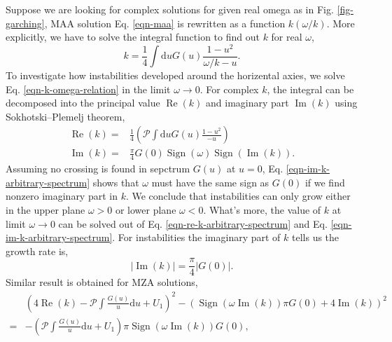 Suppose we are looking for complex solutions for given real omega as in Fig. \ref{fig-garching}, MAA solution Eq. \eqref{eqn-maa} is rewritten as a function $k(\omega/k)$. More explicitly, we have to solve the integral function to find out $k$ for real $\omega$,
\begin{equation}
   k = \frac{1}{4} \int \mathrm du G(u) \frac{ 1 - u^2 }{ \omega/k - u }.
   \label{eqn-k-omega-relation}
\end{equation}
To investigate how instabilities developed around the horizental axies, we solve Eq. \eqref{eqn-k-omega-relation} in the limit $\omega\to 0$. For complex $k$, the integral can be decomposed into the principal value $\operatorname{Re}(k)$ and imaginary part $\operatorname{Im}(k)$ using Sokhotski–Plemelj theorem,
\begin{subequations}
\begin{align}
\operatorname{Re}(k) =& \frac{1}{4}\left(  \mathcal{P} \int \mathrm d u G(u) \frac{ 1 - u^2 }{ - u }  \right)\label{eqn-re-k-arbitrary-spectrum} \\
\operatorname{Im}(k) =&  \frac{\pi}{4}G(0) \operatorname{Sign}\left( \omega \right) \operatorname{Sign}\left(  \operatorname{Im}(k)  \right).
\label{eqn-im-k-arbitrary-spectrum}
\end{align}
\end{subequations}
Assuming no crossing is found in sepctrum $G(u)$ at $u=0$, Eq. \eqref{eqn-im-k-arbitrary-spectrum} shows that $\omega$ must have the same sign as $G(0)$ if we find nonzero imaginary part in $k$. We conclude that instabilities can only grow either in the upper plane $\omega>0$ or lower plane $\omega<0$. What's more, the value of $k$ at limit $\omega\to 0$ can be solved out of Eq. \eqref{eqn-re-k-arbitrary-spectrum} and Eq. \eqref{eqn-im-k-arbitrary-spectrum}. For instabilities the imaginary part of $k$ tells us the growth rate is,
\begin{equation}
   \lvert \operatorname{Im}(k) \rvert  =  \frac{\pi}{4}\lvert G(0)\rvert .
\end{equation}
Similar result is obtained for MZA solutions,
\begin{align}
&\left(4\operatorname{Re}(k) - \mathcal P \int \frac{G(u)}{u} \mathrm d u + U_1 \right)^2  - \left( \operatorname{Sign}(\omega \operatorname{Im}(k) )\pi G(0) +4 \operatorname{Im}(k) \right)^2 \\
=& - \left( \mathcal P \int \frac{G(u)}{u} \mathrm du + U_1 \right) \pi \operatorname{Sign}(\omega \operatorname{Im}(k) ) G(0),
\end{align}
